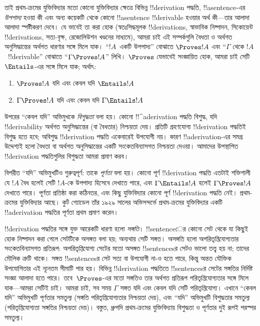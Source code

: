 \documentclass[../../../include/open-logic-section]{subfiles}
\begin{document}
তাই প্রথম-ক্রমের যুক্তিবিদ্যার মতো কোনো যুক্তিবিদ্যার ক্ষেত্রে বিভিন্ন
!!{derivation} পদ্ধতি, !!a{sentence}-এর \emph{উপপাদ্য} হওয়া কী এবং
অন্য কয়েকটি থেকে কোনো !!a{sentence} !!{derivable} হওয়ার অর্থ কী—তার
আলাদা আলাদা স্পষ্টীকরণ দেবে। যে ভাবেই তা করা হোক (স্বতঃসিদ্ধমূলক
!!{derivation}s, স্বাভাবিক নিষ্পাদন, সিকোয়েন্ট !!{derivation}s,
সত্য-বৃক্ষ, রেজোলিউশন খণ্ডনের মাধ্যমে), আমরা চাই এই সম্পর্কগুলি বৈধতা
ও অর্থগত অনুসিদ্ধান্তের অর্থগত ধারণার সঙ্গে মিলে যাক। “$!A$~একটি
উপপাদ্য” বোঝাতে $\Proves !A$ এবং “$\Gamma$ থেকে $!A$~!!{derivable}”
বোঝাতে “$\Gamma \Proves !A$” লিখি। $\Proves$ যেভাবেই সংজ্ঞায়িত হোক,
আমরা চাই সেটি $\Entails$-এর সঙ্গে মিলে যাক; অর্থাৎ:
\begin{enumerate}
\item $\Proves !A$ যদি এবং কেবল যদি $\Entails !A$
\item $\Gamma \Proves !A$ যদি এবং কেবল যদি $\Gamma \Entails !A$
\end{enumerate}
উপরের “কেবল যদি” অভিমুখকে
\emph{বিশুদ্ধতা} বলা হয়। কোনো !!^a{derivation} পদ্ধতি বিশুদ্ধ, যদি
!!{derivability} অর্থগত অনুসিদ্ধান্তের (বা বৈধতার) নিশ্চয়তা দেয়।
প্রতিটি গ্রহণযোগ্য !!{derivation} পদ্ধতিই বিশুদ্ধ হতে হবে; অবিশুদ্ধ
!!{derivation} পদ্ধতি একেবারেই উপযোগী নয়। কারণ !!a{derivation}-এর
সমগ্র উদ্দেশ্যই হলো বৈধতা বা অর্থগত অনুসিদ্ধান্তের একটি সংকেতবিন্যাসগত
নিশ্চয়তা দেওয়া। আমাদের উপস্থাপিত !!{derivation} পদ্ধতিগুলির বিশুদ্ধতা
আমরা প্রমাণ করব।

বিপরীত “যদি” অভিমুখটিও গুরুত্বপূর্ণ: তাকে
\emph{পূর্ণতা} বলা হয়। কোনো পূর্ণ !!{derivation} পদ্ধতি এতটাই শক্তিশালী
যে $!A$ বৈধ হলেই সেটি $!A$-কে উপপাদ্য হিসেবে দেখাতে পারে, এবং
$\Gamma \Entails !A$ হলেই $\Gamma \Proves !A$ দেখাতে পারে।
পূর্ণতা প্রতিষ্ঠা করা কঠিনতর, এবং কিছু যুক্তিবিদ্যার কোনো পূর্ণ
!!{derivation} পদ্ধতি নেই। প্রথম-ক্রমের যুক্তিবিদ্যার আছে। কুর্ট গ্যোডেল
তাঁর ১৯২৯ সালের অভিসন্দর্ভে প্রথম-ক্রমের যুক্তিবিদ্যার একটি
!!a{derivation} পদ্ধতির পূর্ণতা প্রথম প্রমাণ করেন।

!!{derivation} পদ্ধতির সঙ্গে যুক্ত আরেকটি ধারণা হলো
\emph{সঙ্গতি}। !!{sentence}ের কোনো সেট থেকে যা কিছুই হোক
নিষ্পাদন করা গেলে সেটটিকে অসঙ্গত বলা হয়; অন্যথায় সেটি সঙ্গত।
অসঙ্গতি হলো অপরিতৃপ্তিযোগ্যতার সংকেতবিন্যাসগত প্রতিরূপ: অপরিতৃপ্তিযোগ্য
সেটের মতো অসঙ্গত !!{sentence}sর সেটও ভালো তত্ত্ব হয় না; তাদের মৌলিক
ত্রুটি থাকে। সঙ্গত !!{sentence}sর সেট সত্য বা উপযোগী না-ও হতে পারে,
কিন্তু অন্তত যৌক্তিক উপযোগিতার এই ন্যূনতম সীমাটি পার হয়। বিভিন্ন
!!{derivation} পদ্ধতিতে !!{sentence}sর সেটের সঙ্গতির নির্দিষ্ট সংজ্ঞা
আলাদা হতে পারে। তবে~$\Proves$-এর মতো সঙ্গতিও তার অর্থগত প্রতিরূপ
পরিতৃপ্তিযোগ্যতার সঙ্গে মিলে যাক—আমরা সেটিই চাই। আমরা চাই, সব সময়
$\Gamma$ সঙ্গত যদি এবং কেবল যদি সেটি পরিতৃপ্তিযোগ্য। এখানে “কেবল যদি”
অভিমুখটি পূর্ণতার সমতুল্য (সঙ্গতি পরিতৃপ্তিযোগ্যতার নিশ্চয়তা দেয়), এবং
“যদি” অভিমুখটি বিশুদ্ধতার সমতুল্য (পরিতৃপ্তিযোগ্যতা সঙ্গতির নিশ্চয়তা
দেয়)। বস্তুত, ধ্রুপদি প্রথম-ক্রমের যুক্তিবিদ্যায় বিশুদ্ধতা ও পূর্ণতার
দুই রূপই পরস্পর সমতুল্য।
\end{document}
